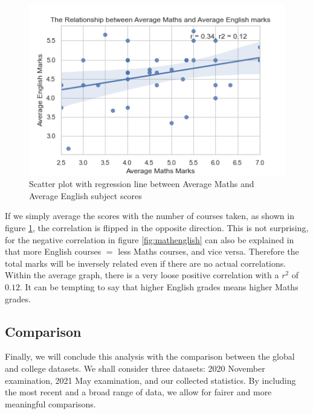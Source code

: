 \documentclass[a4paper,12pt]{tufte-handout}
\begin{document}
\begin{figure}
    \centering
    \includegraphics[width=\textwidth]{assets/avg_maths_english.png}
    \caption{Scatter plot with regression line between Average Maths and Average  English subject scores}
    \label{fig:mathenglishavg}
\end{figure}

If we simply average the scores with the number of courses taken, as shown in figure \ref{fig:mathenglishavg}, the correlation is flipped in the opposite direction. This is not surprising, for the negative correlation in figure \ref{fig:mathenglish} can also be explained in that more English courses $=$ less Maths courses, and vice versa. Therefore the total marks will be inversely related even if there are no actual correlations. Within the average graph, there is a very loose positive correlation with a $r^2$ of $0.12$. It can be tempting to say that higher English grades means higher Maths grades.

\subsection{Comparison}

Finally, we will conclude this analysis with the comparison between the global and college datasets. We shall consider three datasets: 2020 November examination, 2021 May examination, and our collected statistics. By including the most recent and a broad range of data, we allow for fairer and more meaningful comparisons.
\end{document}
